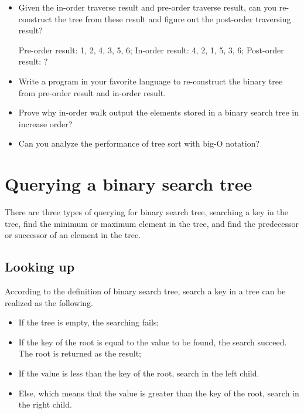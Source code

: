 \documentclass[UTF8]{article}
\begin{document}
\begin{Exercise}

\begin{itemize}
\item Given the in-order traverse result and pre-order traverse result,
can you re-construct the tree from these result and figure out the
post-order traversing result?

Pre-order result: 1, 2, 4, 3, 5, 6;
In-order result: 4, 2, 1, 5, 3, 6;
Post-order result: ?

\item Write a program in your favorite language to re-construct
the binary tree from pre-order result and in-order result.

\item Prove why in-order walk output the elements stored in a binary
search tree in increase order?

\item Can you analyze the performance of tree sort with big-O notation?
\end{itemize}
\end{Exercise}

\section{Querying a binary search tree}

There are three types of querying for binary search tree, searching
a key in the tree, find the minimum or maximum element in the tree,
and find the predecessor or successor of an element in the tree.

\subsection{Looking up}
According to the definition of binary search tree, search
a key in a tree can be realized as the following.

\begin{itemize}
\item If the tree is empty, the searching fails;
\item If the key of the root is equal to the value to be found, the
search succeed. The root is returned as the result;
\item If the value is less than the key of the root, search in the left
child.
\item Else, which means that the value is greater than the key of the
root, search in the right child.
\end{itemize}
\end{document}
